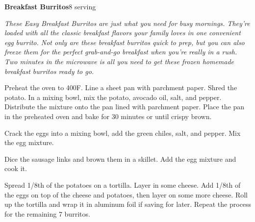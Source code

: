 \documentclass[../recipe-collections/cooking.tex]{subfiles}
\begin{document}
\begin{recipe}{\textbf{Breakfast Burritos}}{8 serving}{}

  \freeform{}\textit{These Easy Breakfast Burritos are just what you need for 
  busy mornings. They're loaded with all the classic breakfast flavors your 
  family loves in one convenient egg burrito. Not only are these breakfast 
  burritos quick to prep, but you can also freeze them for the perfect 
  grab-and-go breakfast when you're really in a rush. Two minutes in the 
  microwave is all you need to get these frozen homemade breakfast burritos 
  ready to go.}


  Preheat the oven to 400F. Line a sheet pan with parchment paper. 
  Shred the potato. In a mixing bowl, mix the potato, avocado oil, salt, and
  pepper. Distribute the mixture onto the pan lined with parchment paper. Place 
  the pan in the preheated oven and bake for 30 minutes or until crispy brown.


  Crack the eggs into a mixing bowl, add the green chiles, salt, and pepper. Mix 
  the egg mixture.


  Dice the sausage links and brown them in a skillet. Add the egg mixture and cook
  it. 
  

  Spread 1/8th of the potatoes on a tortilla. Layer in some cheese. Add 1/8th of 
  the eggs on top of the cheese and potatoes, then layer on some more cheese. 
  Roll up the tortilla and wrap it in aluminum foil if saving for later. Repeat
  the process for the remaining 7 burritos.


\end{recipe}
\end{document}
